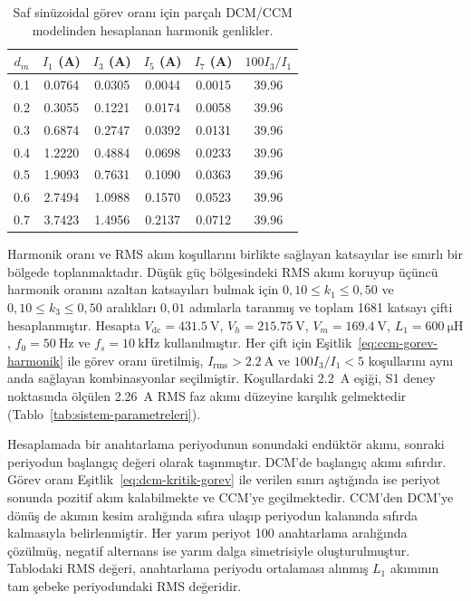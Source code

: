 \begin{table}[H]
  \centering
  \caption{Saf sinüzoidal görev oranı için parçalı DCM/CCM modelinden hesaplanan harmonik genlikler.}
  \label{tab:dcm-saf-sinus-harmonikleri}
  \small
  \begin{tabular}{S[table-format=1.1] S[table-format=1.4] S[table-format=1.4] S[table-format=1.4] S[table-format=1.4] S[table-format=2.2]}
    \toprule
    {$d_m$} & {$I_1$ (A)} & {$I_3$ (A)} & {$I_5$ (A)} & {$I_7$ (A)} & {$100I_3/I_1$} \\
     & 0.0764 & 0.0305 & 0.0044 & 0.0015 & 39.96 \\
    0.2 & 0.3055 & 0.1221 & 0.0174 & 0.0058 & 39.96 \\
    0.3 & 0.6874 & 0.2747 & 0.0392 & 0.0131 & 39.96 \\
    0.4 & 1.2220 & 0.4884 & 0.0698 & 0.0233 & 39.96 \\
    0.5 & 1.9093 & 0.7631 & 0.1090 & 0.0363 & 39.96 \\
    0.6 & 2.7494 & 1.0988 & 0.1570 & 0.0523 & 39.96 \\
    0.7 & 3.7423 & 1.4956 & 0.2137 & 0.0712 & 39.96 \\
    \bottomrule
  \end{tabular}
\end{table}

Harmonik oranı ve RMS akım koşullarını birlikte sağlayan katsayılar ise sınırlı bir bölgede toplanmaktadır. Düşük güç bölgesindeki RMS akımı koruyup üçüncü harmonik oranını azaltan katsayıları bulmak için $0{,}10\leq k_1\leq0{,}50$ ve $0{,}10\leq k_3\leq0{,}50$ aralıkları $0{,}01$ adımlarla taranmış ve toplam \num{1681} katsayı çifti hesaplanmıştır. Hesapta $V_{\mathrm{dc}}=\SI{431.5}{\volt}$, $V_h=\SI{215.75}{\volt}$, $V_m=\SI{169.4}{\volt}$, $L_1=\SI{600}{\micro\henry}$, $f_0=\SI{50}{\hertz}$ ve $f_s=\SI{10}{\kilo\hertz}$ kullanılmıştır. Her çift için Eşitlik~\eqref{eq:ccm-gorev-harmonik} ile görev oranı üretilmiş, $I_{\mathrm{rms}}>\SI{2.2}{\ampere}$ ve $100I_3/I_1<5$ koşullarını aynı anda sağlayan kombinasyonlar seçilmiştir. Koşullardaki \SI{2.2}{\ampere} eşiği, S1 deney noktasında ölçülen \SI{2.26}{\ampere} RMS faz akımı düzeyine karşılık gelmektedir (Tablo~\ref{tab:sistem-parametreleri}).

Hesaplamada bir anahtarlama periyodunun sonundaki endüktör akımı, sonraki periyodun başlangıç değeri olarak taşınmıştır. DCM'de başlangıç akımı sıfırdır. Görev oranı Eşitlik~\eqref{eq:dcm-kritik-gorev} ile verilen sınırı aştığında ise periyot sonunda pozitif akım kalabilmekte ve CCM'ye geçilmektedir. CCM'den DCM'ye dönüş de akımın kesim aralığında sıfıra ulaşıp periyodun kalanında sıfırda kalmasıyla belirlenmiştir. Her yarım periyot \num{100} anahtarlama aralığında çözülmüş, negatif alternans ise yarım dalga simetrisiyle oluşturulmuştur. Tablodaki RMS değeri, anahtarlama periyodu ortalaması alınmış $L_1$ akımının tam şebeke periyodundaki RMS değeridir.


